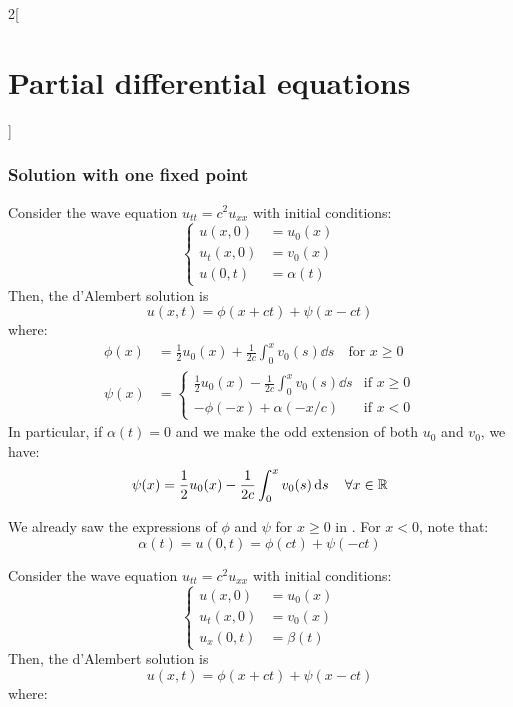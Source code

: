 \documentclass[../../../main_math.tex]{subfiles}
\begin{document}
\begin{multicols}{2}[\section{Partial differential equations}]
  \subsubsection{Solution with one fixed point}
  \begin{proposition}\label{PDE:wave1fixed}
    Consider the wave equation $u_{tt}=c^2u_{xx}$ with initial conditions:
    $$
      \left\{
      \begin{aligned}
        u(x,0)   & =u_0(x)    \\
        u_t(x,0) & =v_0(x)    \\
        u(0,t)   & =\alpha(t)
      \end{aligned}
      \right.
    $$
    Then, the d'Alembert solution is $$u(x,t)=\phi(x+ct)+\psi(x-ct)$$ where:
    \begin{align*}
      \phi(x) & =\frac{1}{2}u_0(x)+\frac{1}{2c}\int_0^xv_0(s)\dd{s}\quad\text{for }x\geq 0 \\
      \psi(x) & =
      \begin{cases}
        \displaystyle\frac{1}{2}u_0(x)-\frac{1}{2c}\int_0^xv_0(s)\dd{s} & \text{if } x\geq 0 \\
        \displaystyle -\phi(-x)+\alpha(-x/c)                            & \text{if } x< 0
      \end{cases}
    \end{align*}
    In particular, if $\alpha(t)=0$ and we make the odd extension of both $u_0$ and $v_0$, we have:
    \begin{equation*}
      \psi(x) =\frac{1}{2}u_0(x)-\frac{1}{2c}\int_0^xv_0(s)\dd{s} \quad\forall x\in\mathbb{R}
    \end{equation*}
  \end{proposition}
  \begin{sproof}
    We already saw the expressions of $\phi$ and $\psi$ for $x\geq 0$ in . For $x<0$, note that: $$\alpha(t)=u(0,t)=\phi(ct)+\psi(-ct)$$
  \end{sproof}
  \begin{proposition}
    Consider the wave equation $u_{tt}=c^2u_{xx}$ with initial conditions:
    $$
      \left\{
      \begin{aligned}
        u(x,0)   & =u_0(x)   \\
        u_t(x,0) & =v_0(x)   \\
        u_x(0,t) & =\beta(t)
      \end{aligned}
      \right.
    $$
    Then, the d'Alembert solution is $$u(x,t)=\phi(x+ct)+\psi(x-ct)$$ where:
    \begin{align*}

\end{align*}
\end{proposition}
\end{multicols}
\end{document}
